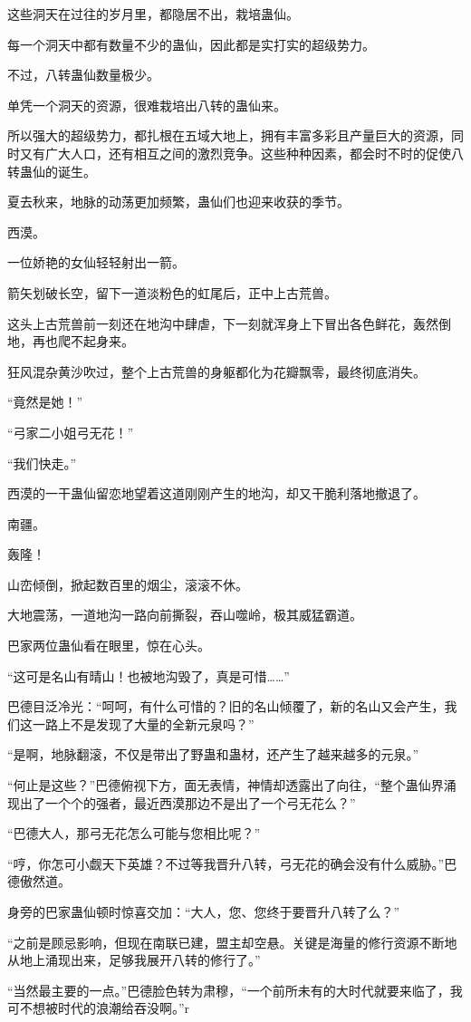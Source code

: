\begin{this_body}
这些洞天在过往的岁月里，都隐居不出，栽培蛊仙。

每一个洞天中都有数量不少的蛊仙，因此都是实打实的超级势力。

不过，八转蛊仙数量极少。

单凭一个洞天的资源，很难栽培出八转的蛊仙来。

所以强大的超级势力，都扎根在五域大地上，拥有丰富多彩且产量巨大的资源，同时又有广大人口，还有相互之间的激烈竞争。这些种种因素，都会时不时的促使八转蛊仙的诞生。

夏去秋来，地脉的动荡更加频繁，蛊仙们也迎来收获的季节。

西漠。

一位娇艳的女仙轻轻射出一箭。

箭矢划破长空，留下一道淡粉色的虹尾后，正中上古荒兽。

这头上古荒兽前一刻还在地沟中肆虐，下一刻就浑身上下冒出各色鲜花，轰然倒地，再也爬不起身来。

狂风混杂黄沙吹过，整个上古荒兽的身躯都化为花瓣飘零，最终彻底消失。

“竟然是她！”

“弓家二小姐弓无花！”

“我们快走。”

西漠的一干蛊仙留恋地望着这道刚刚产生的地沟，却又干脆利落地撤退了。

南疆。

轰隆！

山峦倾倒，掀起数百里的烟尘，滚滚不休。

大地震荡，一道地沟一路向前撕裂，吞山噬岭，极其威猛霸道。

巴家两位蛊仙看在眼里，惊在心头。

“这可是名山有晴山！也被地沟毁了，真是可惜……”

巴德目泛冷光：“呵呵，有什么可惜的？旧的名山倾覆了，新的名山又会产生，我们这一路上不是发现了大量的全新元泉吗？”

“是啊，地脉翻滚，不仅是带出了野蛊和蛊材，还产生了越来越多的元泉。”

“何止是这些？”巴德俯视下方，面无表情，神情却透露出了向往，“整个蛊仙界涌现出了一个个的强者，最近西漠那边不是出了一个弓无花么？”

“巴德大人，那弓无花怎么可能与您相比呢？”

“哼，你怎可小觑天下英雄？不过等我晋升八转，弓无花的确会没有什么威胁。”巴德傲然道。

身旁的巴家蛊仙顿时惊喜交加：“大人，您、您终于要晋升八转了么？”

“之前是顾忌影响，但现在南联已建，盟主却空悬。关键是海量的修行资源不断地从地上涌现出来，足够我展开八转的修行了。”

“当然最主要的一点。”巴德脸色转为肃穆，“一个前所未有的大时代就要来临了，我可不想被时代的浪潮给吞没啊。”r

\end{this_body}

